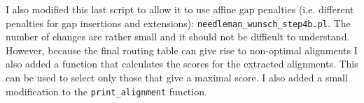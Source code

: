 \documentclass[11pt]{article}
\begin{document}
I also modified this last script to allow it to use affine gap penalties (i.e. different
penalties for gap insertions and extensions): \verb|needleman_wunsch_step4b.pl|. 
The number of changes are rather small
and it should not be difficult to understand. However, because the final routing table
can give rise to non-optimal alignments I also added a function that calculates the scores
for the extracted alignments. This can be used to select only those that give a maximal
score. I also added a small modification to the \verb|print_alignment| function.
\end{document}
